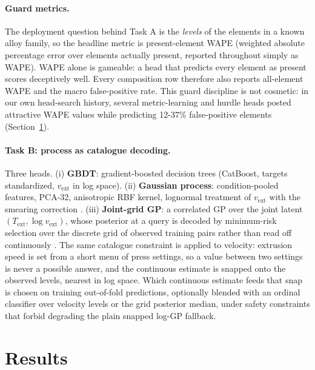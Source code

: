 \documentclass{article}
\newcommand{\Text}{T_{\mathrm{ext}}}
\newcommand{\vext}{v_{\mathrm{ext}}}
\begin{document}
\paragraph{Guard metrics.} The deployment question behind Task A is the
\emph{levels} of the elements in a known alloy family, so the headline metric
is present-element WAPE (weighted absolute percentage error over elements
actually present, reported throughout simply as WAPE). WAPE alone is gameable:
a head that predicts every element as present scores deceptively well. Every
composition row therefore also reports all-element WAPE and the macro
false-positive rate. This guard discipline is not cosmetic: in our own
head-search history, several metric-learning and hurdle heads posted attractive
WAPE values while predicting 12-37\% false-positive elements
(Section~\ref{sec:results}).

\paragraph{Task B: process as catalogue decoding.} Three heads.
(i) \textbf{GBDT}: gradient-boosted decision trees (CatBoost, targets
standardized, $\vext$ in log space). (ii) \textbf{Gaussian process}:
condition-pooled features, PCA-32, anisotropic RBF kernel, lognormal treatment
of $\vext$ with the smearing correction \cite{rasmussen2006gaussian, duan1983smearing}.
(iii) \textbf{Joint-grid GP}: a correlated GP over the joint latent
$(\Text, \log \vext)$, whose posterior at a query is decoded by minimum-risk
selection over the discrete grid of observed training pairs rather than read
off continuously \cite{eikema2022sampling}.
The same catalogue constraint is applied to velocity: extrusion speed is set
from a short menu of press settings, so a value between two settings is never a
possible answer, and the continuous estimate is snapped onto the observed
levels, nearest in log space. Which continuous estimate feeds that snap is
chosen on training out-of-fold predictions, optionally blended with an ordinal
classifier over velocity levels or the grid posterior median, under safety
constraints that forbid degrading the plain snapped log-GP fallback.

\section{Results}
\label{sec:results}
\end{document}
